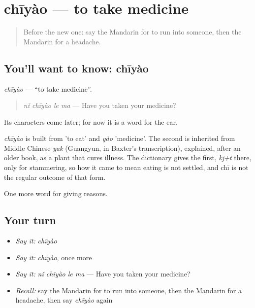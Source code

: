 \section[chīyào]{chīyào — to take medicine}

\label{lesson:ZH-C228-chiyao}



\begin{quote}
Before the new one: say the Mandarin for to run into someone, then the Mandarin for a headache.
\end{quote}

\subsection*{You'll want to know: chīyào}
\emph{chīyào} — \textquotedblleft{}to take medicine\textquotedblright{}.

\begin{quote}
\emph{nǐ chīyào le ma} — Have you taken your medicine?
\end{quote}

Its characters come later; for now it is a word for the ear.

\begin{cousinweb}
\emph{chīyào} is built from  'to eat' and \emph{yào} 'medicine'. The second is inherited from Middle Chinese \emph{yak} (Guangyun, in Baxter's transcription), explained, after an older book, as a plant that cures illness. The dictionary gives the first, \emph{kj+t} there, only for stammering, so how it came to mean eating is not settled, and chī is not the regular outcome of that form.
\end{cousinweb}

\begin{grammarlens}[title={What you've built}]
One more word for giving reasons.
\end{grammarlens}

\subsection*{Your turn}
\begin{itemize}
\raggedright
  \item \emph{Say it:} \emph{chīyào}
  \item \emph{Say it:} \emph{chīyào}, once more
  \item \emph{Say it:} \emph{nǐ chīyào le ma} — Have you taken your medicine?
  \item \emph{Recall:} say the Mandarin for to run into someone, then the Mandarin for a headache, then say \emph{chīyào} again
\end{itemize}

